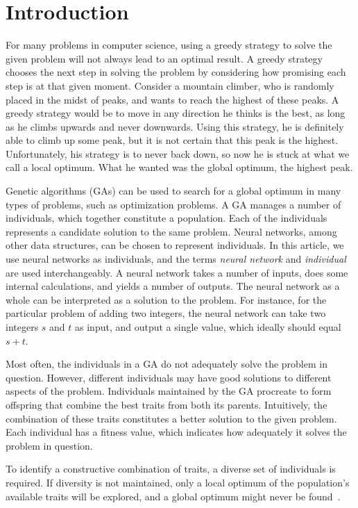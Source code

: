 \section{Introduction}
For many problems in computer science, using a greedy strategy to solve the given problem will not always lead to an optimal result. A greedy strategy chooses the next step in solving the problem by considering how promising each step is at that given moment. Consider a mountain climber, who is randomly placed in the midst of peaks, and wants to reach the highest of these peaks. A greedy strategy would be to move in any direction he thinks is the best, as long as he climbs upwards and never downwards. Using this strategy, he is definitely able to climb up some peak, but it is not certain that this peak is the highest. Unfortunately, his strategy is to never back down, so now he is stuck at what we call a local optimum. What he wanted was the global optimum, the highest peak.
 
Genetic algorithms (GAs) can be used to search for a global optimum in many types of problems, such as optimization problems. A GA manages a number of individuals, which together constitute a population. Each of the individuals represents a candidate solution to the same problem. Neural networks, among other data structures, can be chosen to represent individuals. In this article, we use neural networks as individuals, and the terms \emph{neural network} and \emph{individual} are used interchangeably. A neural network takes a number of inputs, does some internal calculations, and yields a number of outputs. The neural network as a whole can be interpreted as a solution to the problem. For instance, for the particular problem of adding two integers, the neural network can take two integers $s$ and $t$ as input, and output a single value, which ideally should equal $s + t$.

Most often, the individuals in a GA do not adequately solve the problem in question.
However, different individuals may have good solutions to different aspects of the problem.
Individuals maintained by the GA procreate to form offspring that combine the best traits from both its parents. Intuitively, the combination of these traits constitutes a better solution to the given problem. Each individual has a fitness value, which indicates how adequately it solves the problem in question.

To identify a constructive combination of traits, a diverse set of individuals is required. If diversity is not maintained, only a local optimum of the population's available traits will be explored, and a global optimum might never be found~\cite{ursem2002diversity,Darwen00doesextra}.

